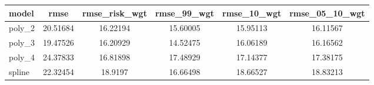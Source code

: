 \documentclass[]{article}
\begin{document}
\begin{tabular}{lccccc} \hline
model & rmse & rmse\_risk\_wgt & rmse\_99\_wgt & rmse\_10\_wgt & rmse\_05\_10\_wgt \\ \hline
poly\_2 & 20.51684 & 16.22194 & 15.60005 & 15.95113 & 16.11567 \\
poly\_3 & 19.47526 & 16.20929 & 14.52475 & 16.06189 & 16.16562 \\
poly\_4 & 24.37833 & 16.81898 & 17.48929 & 17.14377 & 17.38175 \\
 spline & 22.32454 & 18.9197 & 16.66498 & 18.66527 & 18.83213 \\ \hline
\end{tabular}
\end{document}
